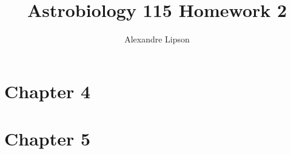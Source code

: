 \documentclass{article}
\title{Astrobiology 115 Homework 2}
\author{Alexandre Lipson}
\begin{document}
\maketitle

\section*{Chapter 4}



\section*{Chapter 5}

\end{document}
